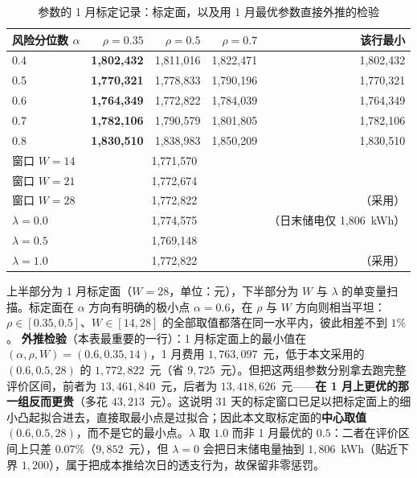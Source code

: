 \begin{table}[htbp]
  \centering
  \caption{参数的 1 月标定记录：标定面，以及用 1 月最优参数直接外推的检验}
  \label{tab:p3-calib}
  \footnotesize
  \begin{tabular}{lrrrr}
    \toprule
    风险分位数 $\alpha$ & $\rho=0.35$ & $\rho=0.5$ & $\rho=0.7$ & 该行最小 \\
    \midrule
    0.4 & \textbf{1,802,432} & 1,811,016 & 1,822,471 & 1,802,432 \\
    0.5 & \textbf{1,770,321} & 1,778,833 & 1,790,196 & 1,770,321 \\
    0.6 & \textbf{1,764,349} & 1,772,822 & 1,784,039 & 1,764,349 \\
    0.7 & \textbf{1,782,106} & 1,790,579 & 1,801,805 & 1,782,106 \\
    0.8 & \textbf{1,830,510} & 1,838,983 & 1,850,209 & 1,830,510 \\
    \midrule
    窗口 $W=14$ & \multicolumn{3}{c}{1,771,570} &  \\
    窗口 $W=21$ & \multicolumn{3}{c}{1,772,674} &  \\
    窗口 $W=28$ & \multicolumn{3}{c}{1,772,822} & （采用） \\
    \midrule
    $\lambda=0.0$ & \multicolumn{3}{c}{1,774,575} & （日末储电仅 1,806~kWh） \\
    $\lambda=0.5$ & \multicolumn{3}{c}{1,769,148} &  \\
    $\lambda=1.0$ & \multicolumn{3}{c}{1,772,822} & （采用） \\
    \bottomrule
  \end{tabular}
  \par\vspace{2pt}
  \begin{minipage}{.92\textwidth}\footnotesize
    上半部分为 1 月标定面（$W=28$，单位：元），下半部分为 $W$ 与 $\lambda$ 的单变量扫描。标定面在 $\alpha$ 方向有明确的极小点 $\alpha=0.6$，在 $\rho$ 与 $W$ 方向则相当平坦：$\rho\in[0.35,0.5]$、$W\in[14,28]$ 的全部取值都落在同一水平内，彼此相差不到 $1\%$。
    \textbf{外推检验}（本表最重要的一行）：1 月标定面上的最小值在 $(\alpha,\rho,W)=(0.6,0.35,14)$，1 月费用 $1,763,097$~元，低于本文采用的 $(0.6,0.5,28)$ 的 $1,772,822$~元（省 $9,725$~元）。但把这两组参数分别拿去跑完整评价区间，前者为 $13,461,840$~元，后者为 $13,418,626$~元——\textbf{在 1 月上更优的那一组反而更贵}（多花 $43,213$~元）。这说明 31 天的标定窗口已足以把标定面上的细小凸起拟合进去，直接取最小点是过拟合；因此本文取标定面的\textbf{中心}\textbf{取值} $(0.6,0.5,28)$，而不是它的最小点。$\lambda$ 取 $1.0$ 而非 1 月最优的 $0.5$：二者在评价区间上只差 $0.07\%$（$9{,}852$~元），但 $\lambda=0$ 会把日末储电量抽到 $1{,}806$~kWh（贴近下界 $1{,}200$），属于把成本推给次日的透支行为，故保留非零惩罚。
  \end{minipage}
\end{table}

